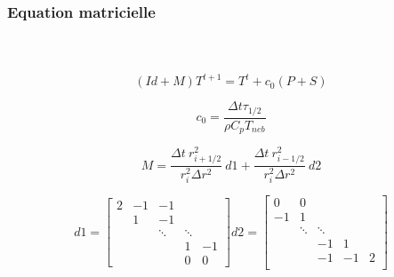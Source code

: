 \documentclass{beamer}
\begin{document}
\begin{frame}
	\frametitle{Equation matricielle}
	\framesubtitle{\ }
	
$$
(Id + M)T^{t+1} = T^t + c_0 ( P + S )
$$	
	
$$c_0 = \frac{\Delta t \tau_{1/2} }{\rho C_p T_{neb}}$$ 

$$
M = \frac{\Delta t ~ r^2_{i+1/2}}{r^2_i \Delta r^2} ~ d1 + \frac{\Delta t ~ r^2_{i-1/2}}{r^2_i \Delta r^2} ~ d2  
$$

$$
d1=
\begin{bmatrix}
    2      & -1     & -1       &   \\
           &  1     & -1              &             \\
     &        & \ddots    &\ddots       \\
     &        &            & 1 & -1         \\
         &   &      &   0         &  0
\end{bmatrix}
d2=
\begin{bmatrix}
     0     & 0      &   &     &        \\
    -1     & 1      &  &          &            \\
     & \ddots & \ddots &    &      \\
     &              &  -1      &  1         \\
         &      &  -1     & -1        & 2 \\
\end{bmatrix}
$$

\end{frame}


\end{document}
